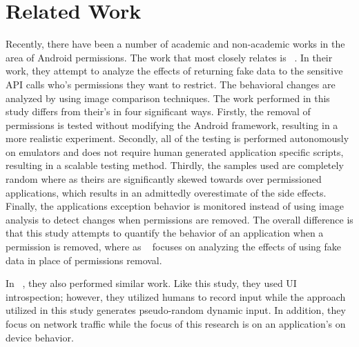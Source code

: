 \chapter{Related Work}
\label{sec:related}
Recently, there have been a number of academic and non-academic works in the area of Android permissions.  The work that most closely relates is ~\cite{Hornyack:2011:TAD:2046707.2046780}.  In their work, they attempt to analyze the effects of returning fake data to the sensitive API calls who's permissions they want to restrict.  The behavioral changes are analyzed by using image comparison techniques.  The work performed in this study differs from their's in four significant ways.  Firstly, the removal of permissions is tested without modifying the Android framework, resulting in a more realistic experiment.  Secondly, all of the testing is performed autonomously on emulators and does not require human generated application specific scripts, resulting in a scalable testing method.  Thirdly, the samples used are completely random where as theirs are significantly skewed towards over permissioned applications, which results in an admittedly overestimate of the side effects.  Finally, the applications exception behavior is monitored instead of using image analysis to detect changes when permissions are removed.  The overall difference is that this study attempts to quantify the behavior of an application when a permission is removed, where as ~\cite{Hornyack:2011:TAD:2046707.2046780} focuses on analyzing the effects of using fake data in place of permissions removal.  

In ~\cite{Rastogi:2013:AAS:2435349.2435379}, they also performed similar work.  Like this study, they used UI introspection; however, they utilized humans to record input while the approach utilized in this study generates pseudo-random dynamic input.  In addition, they focus on network traffic while the focus of this research is on an application's on device behavior.  


